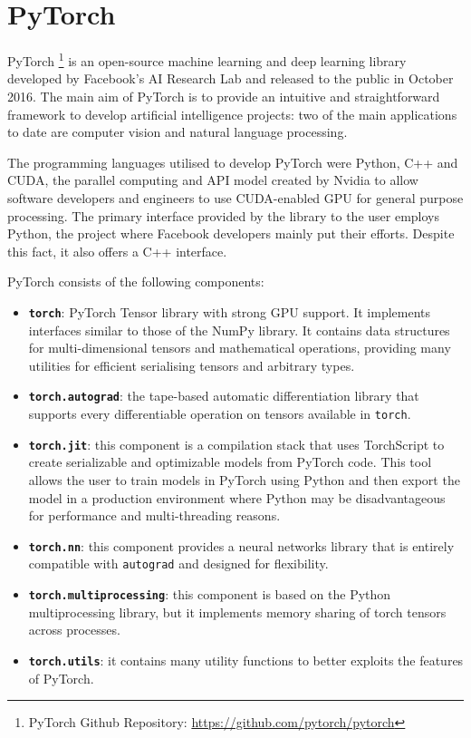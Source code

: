 \section{PyTorch}

PyTorch \footnote{PyTorch Github Repository: \href{https://github.com/pytorch/pytorch}{https://github.com/pytorch/pytorch}} \cite{paszke2017automatic}  is an open-source machine learning and deep learning library developed by Facebook's AI Research Lab and released to the public in October 2016.
The main aim of PyTorch is to provide an intuitive and straightforward framework to develop artificial intelligence projects: two of the main applications to date are computer vision and natural language processing.

The programming languages utilised to develop PyTorch were Python, C++ and CUDA, the parallel computing and API model created by Nvidia to allow software developers and engineers to use CUDA-enabled GPU for general purpose processing.
The primary interface provided by the library to the user employs Python, the project where Facebook developers mainly put their efforts.
Despite this fact, it also offers a C++ interface.

PyTorch consists of the following components:
\begin{itemize}
	\item \textbf{\texttt{torch}}: PyTorch Tensor library with strong GPU support.
It implements interfaces similar to those of the NumPy library.
It contains data structures for multi-dimensional tensors and mathematical operations, providing many utilities for efficient serialising tensors and arbitrary types.
	\item \textbf{\texttt{torch.autograd}}: the tape-based automatic differentiation library that supports every differentiable operation on tensors available in \texttt{torch}.
	\item \textbf{\texttt{torch.jit}}: this component is a compilation stack that uses TorchScript to create serializable and optimizable models from PyTorch code.
This tool allows the user to train models in PyTorch using Python and then export the model in a production environment where Python may be disadvantageous for performance and multi-threading reasons.
	\item \textbf{\texttt{torch.nn}}: this component provides a neural networks library that is entirely compatible with \texttt{autograd} and designed for flexibility.
	\item \textbf{\texttt{torch.multiprocessing}}: this component is based on the Python multiprocessing library, but it implements memory sharing of torch tensors across processes.
	\item \textbf{\texttt{torch.utils}}: it contains many utility functions to better exploits the features of PyTorch.
\end{itemize}


